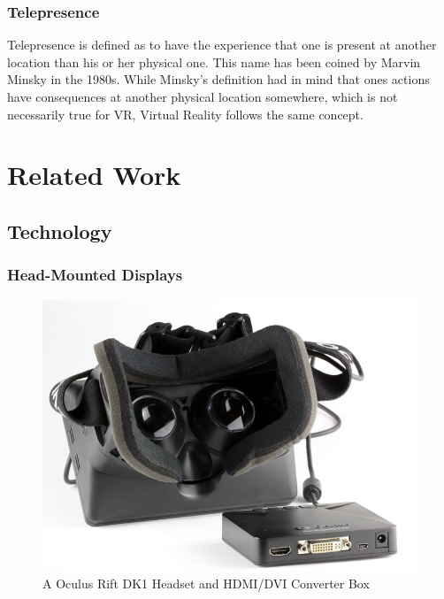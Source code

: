 \documentclass[11pt]{article}
\begin{document}
		\subsubsection{Telepresence}
			Telepresence is defined as to have the experience that one is present at another location than his or her physical one.  This name has been coined by Marvin Minsky in the 1980s. \cite{minsky1980telepresence} While Minsky's definition had in mind that ones actions have consequences at another physical location somewhere, which is not necessarily true for VR, Virtual Reality follows the same concept.
			
\section{Related Work}
	\subsection{Technology}
	\subsubsection{Head-Mounted Displays}
	
	\begin{figure}
		\vspace{-20pt}
		\begin{center}
			\includegraphics[scale=0.3]{images/or_small.png}
		\end{center}			
		\vspace{-20pt}
			\caption{A Oculus Rift DK1 Headset and HDMI/DVI Converter Box}
		\vspace{-10pt}
	\end{figure}
	
\end{document}
